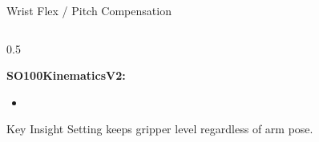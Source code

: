\begin{frame}{Wrist Flex / Pitch Compensation}
\begin{columns}
\begin{column}{0.5\textwidth}
    \vspace{0.2cm}

    \textbf{SO100KinematicsV2:}
    \begin{itemize}
        \item {}
    \end{itemize}

    \vspace{0.3cm}

    \begin{block}{Key Insight}
    Setting  keeps gripper level regardless of arm pose.
    \end{block}
\end{column}
\end{columns}
\end{frame}

